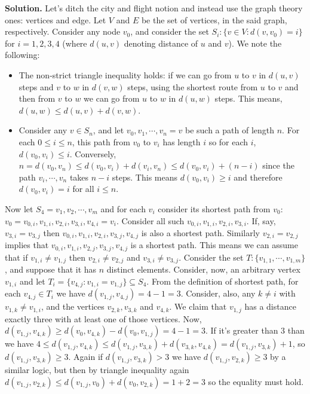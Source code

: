 \documentclass[11pt,a4paper]{article}
\begin{document}
\begin{enumerate}
	\textbf{Solution.} Let's ditch the city and flight notion and instead use the graph theory ones: vertices and edge. Let $V$ and $E$ be the set of vertices, in the said graph, respectively. Consider any node $v_0$, and consider the set $S_i: \{v\in V: d(v, v_0)=i\}$ for $i=1, 2, 3, 4$ (where $d(u, v)$ denoting distance of $u$ and $v$). We note the following: 
	\begin{itemize}
		\item The non-strict triangle inequality holds: if we can go from $u$ to $v$ in $d(u, v)$ steps and $v$ to $w$ in $d(v, w)$ steps, using the shortest route from $u$ to $v$ and then from $v$ to $w$ we can go from $u$ to $w$ in $d(u, w)$ steps. This means, $d(u, w)\le d(u, v)+d(v, w)$. 
		
		\item Consider any $v\in S_n$, and let $v_0, v_1, \cdots , v_n=v$ be such a path of length $n$. For each $0\le i\le n$, this path from $v_0$ to $v_i$ has length $i$ so for each $i$, $d(v_0, v_i)\le i$. Conversely, $n=d(v_0, v_n)\le d(v_0, v_i)+d(v_i, v_n)\le d(v_0, v_i)+(n-i)$ since the path $v_i, \cdots , v_n$ takes $n-i$ steps. This means $d(v_0, v_i)\ge i$ and therefore $d(v_0, v_i)=i$ for all $i\le n$. 
	\end{itemize}
	Now let $S_4=v_1, v_2, \cdots , v_m$ and for each $v_i$ consider its shortest path from $v_0$: $v_0=v_{0, i}, v_{1, i}, v_{2, i}, v_{3, i}, v_{4, i}=v_i$. Consider all such $v_{0, i}, v_{1, i}, v_{2, i}, v_{3, i}$. If, say, $v_{3, i}=v_{3, j}$ then $v_{0, i}, v_{1, i}, v_{2, i}, v_{3, j}, v_{4, j}$ is also a shortest path. Similarly $v_{2, i}=v_{2, j}$ implies that $v_{0, i}, v_{1, i}, v_{2, j}, v_{3, j}, v_{4, j}$ is a shortest path. 
	This means we can assume that if $v_{1, i}\neq v_{1, j}$ then $v_{2, i}\neq v_{2, j}$ and $v_{3, i}\neq v_{3, j}$. 
	Consider the set $T: \{v_{1, 1}, \cdots , v_{1, m}\}$, and suppose that it has $n$ distinct elements. 
	Consider, now, an arbitrary vertex $v_{1, i}$ and let $T_i = \{v_{4, j}: v_{1, i}=v_{1, j}\}\subseteq S_4$. 
	From the definition of shortest path, for each $v_{4, j}\in T_i$ we have $d(v_{1, j}, v_{4, j})=4-1=3$. 
	Consider, also, any $k\neq i$ with $v_{1, k}\neq v_{1, i}$, and the vertices $v_{2, k}, v_{3, k}$ and $v_{4, k}$. We claim that $v_{1, j}$ has a distance exactly three with at least one of those vertices. 
	Now, $d(v_{1, j}, v_{4, k})\ge d(v_0, v_{4, k}) - d(v_0, v_{1, j})=4-1=3$. If it's greater than 3 than we have 
	$4\le d(v_{1, j}, v_{4, k})\le d(v_{1, j}, v_{3, k}) + d(v_{3, k}, v_{4, k}) = d(v_{1, j}, v_{3, k}) + 1$, so $d(v_{1, j}, v_{3, k})\ge 3$. Again if $d(v_{1, j}, v_{3, k}) > 3$ we have $d(v_{1, j}, v_{2, k})\ge 3$ by a similar logic, but then by triangle inequality again $d(v_{1, j}, v_{2, k})\le d(v_{1, j}, v_0)+d(v_0, v_{2, k})=1+2=3$ so the equality must hold. 
	

\end{enumerate}
\end{document}
